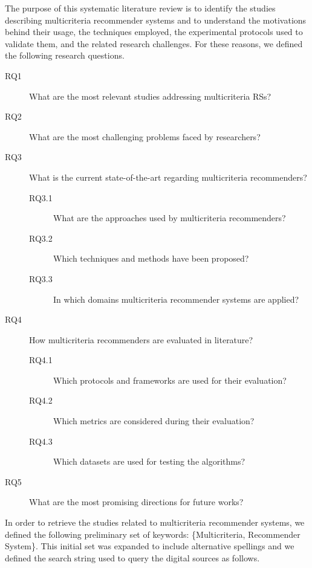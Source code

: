 The purpose of this systematic literature review is to identify the studies describing multicriteria recommender systems and to understand the motivations behind their usage, the techniques employed, the experimental protocols used to validate them, and the related research challenges. For these reasons, we defined the following research questions.

\begin{description}
\item[RQ1\label{mcr:itm:rq1}] What are the most relevant studies addressing multicriteria RSs?
\item[RQ2\label{mcr:itm:rq2}] What are the most challenging problems faced by researchers?

\item[RQ3] What is the current state-of-the-art regarding multicriteria recommenders?
\begin{description}
\item[RQ3.1\label{mcr:itm:rq3}] What are the approaches used by multicriteria recommenders?
\item[RQ3.2\label{mcr:itm:rq4}] Which techniques and methods have been proposed?
\item[RQ3.3\label{mcr:itm:rq5}] In which domains multicriteria recommender systems are applied?
\end{description}

\item[RQ4] How multicriteria recommenders are evaluated in literature?
\begin{description}
\item[RQ4.1\label{mcr:itm:rq6}] Which protocols and frameworks are used for their evaluation?
\item[RQ4.2\label{mcr:itm:rq7}] Which metrics are considered during their evaluation?
\item[RQ4.3\label{mcr:itm:rq8}] Which datasets are used for testing the algorithms?
\end{description}

\item[RQ5\label{mcr:itm:rq9}] What are the most promising directions for future works?
\end{description}

In order to retrieve the studies related to multicriteria recommender systems, we defined the following preliminary set of keywords: \{Multicriteria, Recommender System\}. This initial set was expanded to include alternative spellings and we defined the search string used to query the digital sources as follows.

